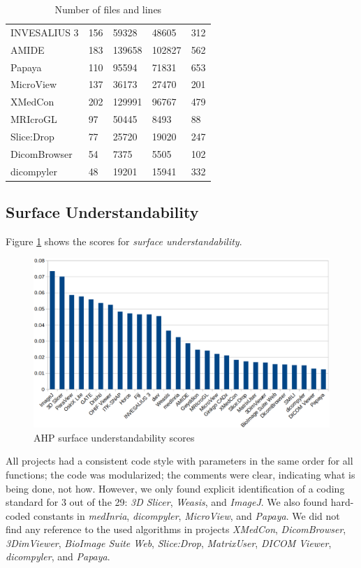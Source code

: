 \documentclass[preprint,12pt,authoryear]{elsarticle}
\begin{document}
\begin{table}[ht]
\begin{tabular}{lllll}
INVESALIUS 3 & 156 & 59328 & 48605 & 312 \\
AMIDE & 183 & 139658 & 102827 & 562 \\
Papaya & 110 & 95594 & 71831 & 653 \\
MicroView & 137 & 36173 & 27470 & 201 \\
XMedCon & 202 & 129991 & 96767 & 479 \\
MRIcroGL & 97 & 50445 & 8493 & 88 \\
Slice:Drop & 77 & 25720 & 19020 & 247 \\
DicomBrowser & 54 & 7375 & 5505 & 102 \\
dicompyler & 48 & 19201 & 15941 & 332 \\ \hline
\end{tabular}
\caption{\label{tab_loc_per_file}Number of files and lines}
\end{table}

\subsection{Surface Understandability} \label{sec_result_understandability}

Figure \ref{fg_surface_understandability_scores} shows the scores for
\textit{surface understandability}.

\begin{figure}[ht]
\includegraphics[scale=0.38]{figures/understandability_scores.png}
\caption{AHP surface understandability scores}
\label{fg_surface_understandability_scores}
\end{figure}

All projects had a consistent code style with parameters in the same order for
all functions; the code was modularized; the comments were clear, indicating
what is being done, not how. However, we only found explicit identification of a
coding standard for 3 out of the 29: \textit{3D Slicer}, \textit{Weasis}, and
\textit{ImageJ}. We also found hard-coded constants in \textit{medInria},
\textit{dicompyler}, \textit{MicroView}, and \textit{Papaya}. We did not find
any reference to the used algorithms in projects \textit{XMedCon},
\textit{DicomBrowser}, \textit{3DimViewer}, \textit{BioImage Suite Web},
\textit{Slice:Drop}, \textit{MatrixUser}, \textit{DICOM Viewer},
\textit{dicompyler}, and \textit{Papaya}. 
\end{document}
